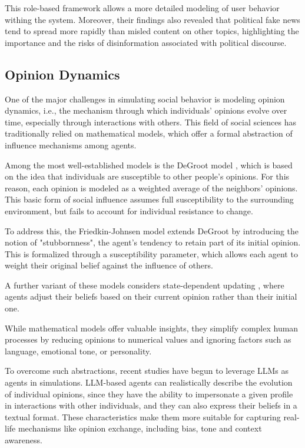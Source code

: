 This role-based framework allows a more detailed modeling of user behavior withing the system.
Moreover, their findings also revealed that political fake news tend to spread more rapidly than misled content on other topics, highlighting the importance and the risks of disinformation associated with political discourse.



\subsection{Opinion Dynamics}
One of the major challenges in simulating social behavior is modeling opinion dynamics, i.e., the mechanism through which individuals' opinions evolve over time, especially through interactions with others. 
This field of social sciences has traditionally relied on mathematical models, which offer a formal abstraction of influence mechanisms among agents.

\medskip
Among the most well-established models is the DeGroot model \cite{Degroot1974}, which is based on the idea that individuals are susceptible to other people's opinions. For this reason, each opinion is modeled as a weighted average of the neighbors' opinions.
This basic form of social influence assumes full susceptibility to the surrounding environment, but fails to account for individual resistance to change.

To address this, the Friedkin-Johnsen model \cite{friedkin_1990} extends DeGroot by introducing the notion of "stubbornness", the agent's tendency to retain part of its initial opinion. 
This is formalized through a susceptibility parameter, which allows each agent to weight their original belief against the influence of others.

A further variant of these models considers state-dependent updating \cite{Ye2018Opinion, Liu_2018}, where agents adjust their beliefs based on their current opinion rather than their initial one.


\medskip
While mathematical models offer valuable insights, they  simplify complex human processes by reducing opinions to numerical values and ignoring factors such as language, emotional tone, or personality.

To overcome such abstractions, recent studies have begun to leverage LLMs as agents in simulations. LLM-based agents can realistically describe the evolution of individual opinions, since they have the ability to impersonate a given profile in interactions with other individuals, and they can also express their beliefs in a textual format.
These characteristics make them more suitable for capturing real-life mechanisms like opinion exchange, including bias, tone and context awareness.

